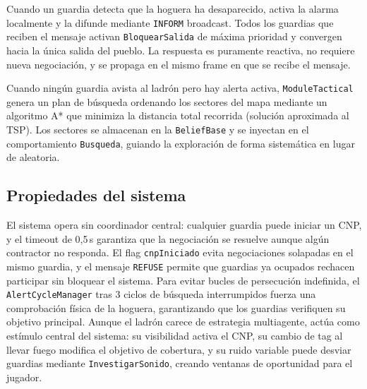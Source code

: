 \documentclass[a4paper,12pt]{article}
\begin{document}
Cuando un guardia detecta que la hoguera ha desaparecido, activa la alarma
localmente y la difunde mediante \texttt{INFORM} broadcast. Todos los guardias
que reciben el mensaje activan \texttt{BloquearSalida} de máxima prioridad y
convergen hacia la única salida del pueblo. La respuesta es puramente reactiva,
no requiere nueva negociación, y se propaga en el mismo frame en que se recibe
el mensaje.

Cuando ningún guardia avista al ladrón pero hay alerta activa,
\texttt{ModuleTactical} genera un plan de búsqueda ordenando los sectores del
mapa mediante un algoritmo A* que minimiza la distancia total recorrida
(solución aproximada al TSP). Los sectores se almacenan en la
\texttt{BeliefBase} y se inyectan en el comportamiento \texttt{Busqueda},
guiando la exploración de forma sistemática en lugar de aleatoria.

\subsection{Propiedades del sistema}

El sistema opera sin coordinador central: cualquier guardia puede iniciar un
CNP, y el timeout de 0,5\,s garantiza que la negociación se resuelve aunque
algún contractor no responda. El flag \texttt{cnpIniciado} evita negociaciones
solapadas en el mismo guardia, y el mensaje \texttt{REFUSE} permite que
guardias ya ocupados rechacen participar sin bloquear el sistema.
Para evitar bucles de persecución indefinida, el \texttt{AlertCycleManager}
tras 3 ciclos de búsqueda interrumpidos fuerza una comprobación física de la
hoguera, garantizando que los guardias verifiquen su objetivo principal.
Aunque el ladrón carece de estrategia multiagente, actúa como estímulo
central del sistema: su visibilidad activa el CNP, su cambio de tag al llevar
fuego modifica el objetivo de cobertura, y su ruido variable puede desviar
guardias mediante \texttt{InvestigarSonido}, creando ventanas de oportunidad
para el jugador.
\end{document}
